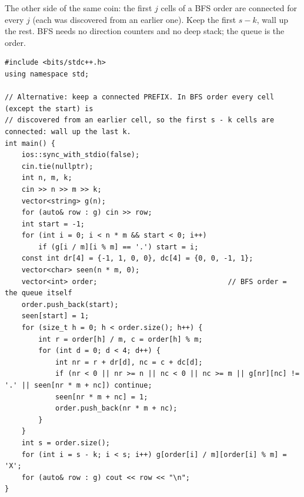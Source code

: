 \begin{alternativebox}
The other side of the same coin: the first $j$ cells of a BFS order are connected for every $j$ (each was discovered from an earlier one). Keep the first $s - k$, wall up the rest. BFS needs no direction counters and no deep stack; the queue is the order.

\begin{lstlisting}[style=cpp]
#include <bits/stdc++.h>
using namespace std;

// Alternative: keep a connected PREFIX. In BFS order every cell (except the start) is
// discovered from an earlier cell, so the first s - k cells are connected: wall up the last k.
int main() {
    ios::sync_with_stdio(false);
    cin.tie(nullptr);
    int n, m, k;
    cin >> n >> m >> k;
    vector<string> g(n);
    for (auto& row : g) cin >> row;
    int start = -1;
    for (int i = 0; i < n * m && start < 0; i++)
        if (g[i / m][i % m] == '.') start = i;
    const int dr[4] = {-1, 1, 0, 0}, dc[4] = {0, 0, -1, 1};
    vector<char> seen(n * m, 0);
    vector<int> order;                               // BFS order = the queue itself
    order.push_back(start);
    seen[start] = 1;
    for (size_t h = 0; h < order.size(); h++) {
        int r = order[h] / m, c = order[h] % m;
        for (int d = 0; d < 4; d++) {
            int nr = r + dr[d], nc = c + dc[d];
            if (nr < 0 || nr >= n || nc < 0 || nc >= m || g[nr][nc] != '.' || seen[nr * m + nc]) continue;
            seen[nr * m + nc] = 1;
            order.push_back(nr * m + nc);
        }
    }
    int s = order.size();
    for (int i = s - k; i < s; i++) g[order[i] / m][order[i] % m] = 'X';
    for (auto& row : g) cout << row << "\n";
}
\end{lstlisting}


\end{alternativebox}
